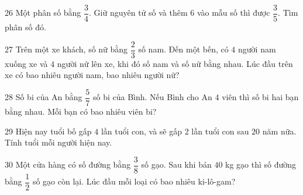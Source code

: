 \gap
\begin{probbox}{26}{\relax}
Một phân số bằng $\dfrac34$. Giữ nguyên tử số và thêm $6$ vào mẫu số thì được $\dfrac35$. Tìm phân số đó.
\end{probbox}
\gap
\begin{probbox}{27}{\relax}
Trên một xe khách, số nữ bằng $\dfrac23$ số nam. Đến một bến, có $4$ người nam xuống xe và $4$ người nữ lên xe, khi đó số nam và số nữ bằng nhau. Lúc đầu trên xe có bao nhiêu người nam, bao nhiêu người nữ?
\end{probbox}
\gap
\begin{probbox}{28}{\relax}
Số bi của An bằng $\dfrac57$ số bi của Bình. Nếu Bình cho An $4$ viên thì số bi hai bạn bằng nhau. Mỗi bạn có bao nhiêu viên bi?
\end{probbox}
\gap
\begin{probbox}{29}{\relax}
Hiện nay tuổi bố gấp $4$ lần tuổi con, và sẽ gấp $2$ lần tuổi con sau $20$ năm nữa. Tính tuổi mỗi người hiện nay.
\end{probbox}
\gap
\begin{probbox}{30}{\relax}
Một cửa hàng có số đường bằng $\dfrac38$ số gạo. Sau khi bán $40$ kg gạo thì số đường bằng $\dfrac12$ số gạo còn lại. Lúc đầu mỗi loại có bao nhiêu ki-lô-gam?
\end{probbox}
